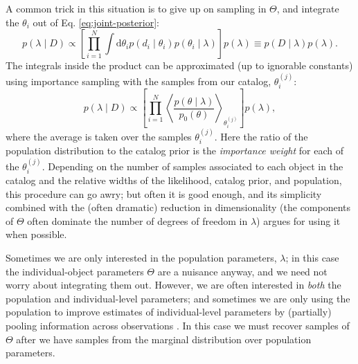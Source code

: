 \documentclass[modern]{aastex63}
\newcommand{\dd}{\ensuremath{\mathrm{d}}}
\begin{document}
A common trick in this situation \citep{Hogg2010} is to give up on sampling in
$\Theta$, and integrate the $\theta_i$ out of Eq. \eqref{eq:joint-posterior}:
%
\begin{equation}
  p\left( \lambda \mid D \right) \propto \left[ \prod_{i=1}^N \int \dd \theta_i p\left( d_i \mid \theta_i \right) p\left( \theta_i \mid \lambda \right) \right] p\left( \lambda \right) \equiv p\left( D \mid \lambda \right) p\left( \lambda \right).
\end{equation}
%
The integrals inside the product can be approximated (up to ignorable constants)
using importance sampling with the samples from our catalog, $\theta_i^{(j)}$:
%
\begin{equation}
  \label{eq:marginal-population}
  p\left( \lambda \mid D \right) \propto \left[ \prod_{i=1}^N \left\langle \frac{p\left(\theta \mid \lambda \right)}{p_0\left( \theta \right)} \right\rangle_{\theta_i^{(j)}} \right] p\left( \lambda \right),
\end{equation}
%
where the average is taken over the samples $\theta_i^{(j)}$.  Here the ratio of
the population distribution to the catalog prior is the \emph{importance weight}
for each of the $\theta_i^{(j)}$.  Depending on the number of samples associated
to each object in the catalog and the relative widths of the likelihood, catalog
prior, and population, this procedure can go awry; but often it is good enough,
and its simplicity combined with the (often dramatic) reduction in
dimensionality (the components of $\Theta$ often dominate the number of degrees
of freedom in $\lambda$) argues for using it when possible.

Sometimes we are only interested in the population parameters, $\lambda$; in
this case the individual-object parameters $\Theta$ are a nuisance anyway, and
we need not worry about integrating them out.  However, we are often interested
in \emph{both} the population and individual-level parameters; and sometimes we
are only using the population to improve estimates of individual-level
parameters by (partially) pooling information across observations
\citep{Lieu2017}.  In this case we must recover samples of $\Theta$ after we
have samples from the marginal distribution over population parameters.
\end{document}
